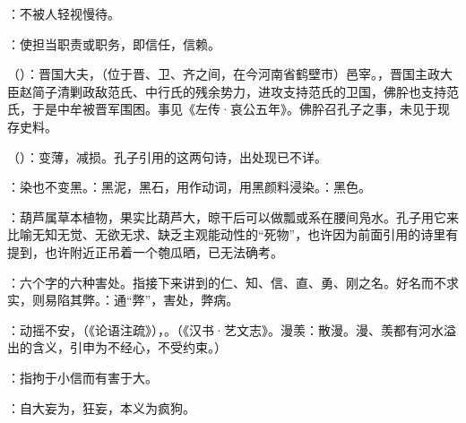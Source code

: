 {
\item {}：不被人轻视慢待。
\item {}：使担当职责或职务，即信任，信赖。
}
{}


{
\item {}（）：晋国大夫，（位于晋、卫、齐之间，在今河南省鹤壁市）邑宰。，晋国主政大臣赵简子清剿政敌范氏、中行氏的残余势力，进攻支持范氏的卫国，佛肸也支持范氏，于是中牟被晋军围困。事见《左传·哀公五年》。佛肸召孔子之事，未见于现存史料。%
\item {}（）：变薄，减损。孔子引用的这两句诗，出处现已不详。

：染也不变黑。：黑泥，黑石，用作动词，用黑颜料浸染。：黑色。

\item {}：葫芦属草本植物，果实比葫芦大，晾干后可以做瓢或系在腰间凫水。孔子用它来比喻无知无觉、无欲无求、缺乏主观能动性的“死物”，也许因为前面引用的诗里有提到，也许附近正吊着一个匏瓜晒，已无法确考。
}
{}


{
\item {}：六个字的六种害处。指接下来讲到的仁、知、信、直、勇、刚之名。好名而不求实，则易陷其弊。：通“弊”，害处，弊病。
\item {}：动摇不安，（《论语注疏》），。（《汉书·艺文志》。漫羡：散漫。漫、羡都有河水溢出的含义，引申为不经心，不受约束。）
\item {}：指拘于小信而有害于大。
\item {}：自大妄为，狂妄，本义为疯狗。
}
{}  %


